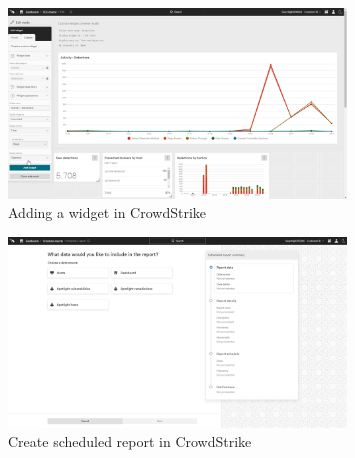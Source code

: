 \begin{figure}[htbp]
      \centering
      \includegraphics[width=0.8\textwidth]{Figures/CrowdStrike/add-widget.png}
      \caption{Adding a widget in CrowdStrike}
\end{figure}


\begin{figure}[htbp]
      \centering
      \includegraphics[width=0.8\textwidth]{Figures/CrowdStrike/Scheduled_Report.png}
      \caption{Create scheduled report in CrowdStrike}
\end{figure}

